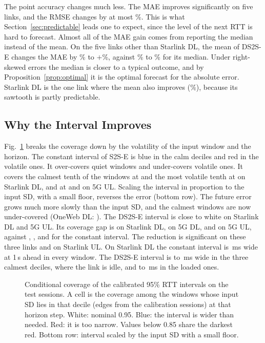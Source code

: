 The point accuracy changes much less. The MAE improves significantly on five links, and the RMSE changes by at most \BSRMSEMaxAbs\%. This is what Section~\ref{sec:predictable} leads one to expect, since the level of the next RTT is hard to forecast. Almost all of the MAE gain comes from reporting the median instead of the mean. On the five links other than Starlink DL, the mean of DS2S-E changes the MAE by \MeanMAELo\% to $+$\MeanMAEHi\%, against \MedMAELo\% to \MedMAEHi\% for its median. Under right-skewed errors the median is closer to a typical outcome, and by Proposition~\ref{prop:optimal} it is the optimal forecast for the absolute error. Starlink DL is the one link where the mean also improves (\MeanMAESLDL\%), because its sawtooth is partly predictable.

\subsection{Why the Interval Improves}
Fig.~\ref{fig:condcov} breaks the coverage down by the volatility of the input window and the horizon. The constant interval of S2S-E is blue in the calm deciles and red in the volatile ones. It over-covers quiet windows and under-covers volatile ones. It covers the calmest tenth of the windows at \CovConstSLDLdOne{} and the most volatile tenth at \CovConstSLDLdTen{} on Starlink DL, and at \CovConstQULdOne{} and \CovConstQULdTen{} on 5G UL. Scaling the interval in proportion to the input SD, with a small floor, reverses the error (bottom row). The future error grows much more slowly than the input SD, and the calmest windows are now under-covered (OneWeb DL: \CovNormOWDLdOne). The DS2S-E interval is close to white on Starlink DL and 5G UL. Its coverage gap is \GapDSSLDL{} on Starlink DL, \GapDSQDL{} on 5G DL, and \GapDSQUL{} on 5G UL, against \GapConstSLDL{}, \GapConstQDL{}, and \GapConstQUL{} for the constant interval. The reduction is significant on these three links and on Starlink UL. On Starlink DL the constant interval is \WidConstSLDL\,ms wide at 1\,s ahead in every window. The DS2S-E interval is \WidDSSLDLcalmLo{} to \WidDSSLDLcalmHi\,ms wide in the three calmest deciles, where the link is idle, and \WidDSSLDLloadLo{} to \WidDSSLDLloadHi\,ms in the loaded ones.

\begin{figure}[t]
  \centering
  
  \caption{Conditional coverage of the calibrated 95\% RTT intervals on the test sessions. A cell is the coverage among the windows whose input SD lies in that decile (edges from the calibration sessions) at that horizon step. White: nominal 0.95. Blue: the interval is wider than needed. Red: it is too narrow. Values below 0.85 share the darkest red. Bottom row: interval scaled by the input SD with a small floor.}
  \label{fig:condcov}
\end{figure}

